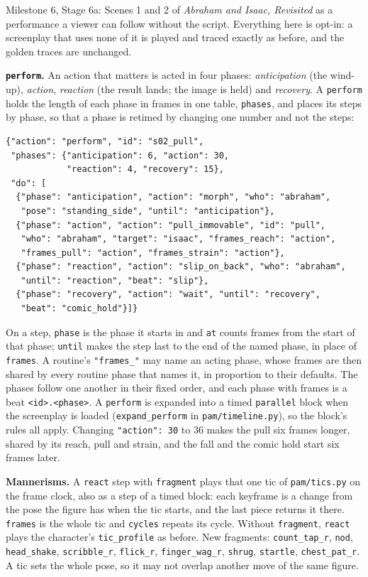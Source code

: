 \documentclass[
  12pt,
  letterpaper,
]{book}
\begin{document}
Milestone 6, Stage 6a: Scenes 1 and 2 of \emph{Abraham and Isaac,
Revisited} as a performance a viewer can follow without the script.
Everything here is opt-in: a screenplay that uses none of it is played
and traced exactly as before, and the golden traces are unchanged.

\textbf{\texttt{perform}.} An action that matters is acted in four
phases: \emph{anticipation} (the wind-up), \emph{action}, \emph{reaction}
(the result lands; the image is held) and \emph{recovery}. A
\texttt{perform} holds the length of each phase in frames in one table,
\texttt{phases}, and places its steps by phase, so that a phase is
retimed by changing one number and not the steps:

\begin{verbatim}
{"action": "perform", "id": "s02_pull",
 "phases": {"anticipation": 6, "action": 30,
            "reaction": 4, "recovery": 15},
 "do": [
  {"phase": "anticipation", "action": "morph", "who": "abraham",
   "pose": "standing_side", "until": "anticipation"},
  {"phase": "action", "action": "pull_immovable", "id": "pull",
   "who": "abraham", "target": "isaac", "frames_reach": "action",
   "frames_pull": "action", "frames_strain": "action"},
  {"phase": "reaction", "action": "slip_on_back", "who": "abraham",
   "until": "reaction", "beat": "slip"},
  {"phase": "recovery", "action": "wait", "until": "recovery",
   "beat": "comic_hold"}]}
\end{verbatim}

On a step, \texttt{phase} is the phase it starts in and \texttt{at}
counts frames from the start of that phase; \texttt{until} makes the
step last to the end of the named phase, in place of \texttt{frames}. A
routine's \texttt{"frames\_<its phase>"} may name an acting phase, whose
frames are then shared by every routine phase that names it, in
proportion to their defaults. The phases follow one another in their
fixed order, and each phase with frames is a beat
\texttt{<id>.<phase>}. A \texttt{perform} is expanded into a timed
\texttt{parallel} block when the screenplay is loaded
(\texttt{expand\_perform} in \texttt{pam/timeline.py}), so the block's
rules all apply. Changing \texttt{"action": 30} to 36 makes the pull six
frames longer, shared by its reach, pull and strain, and the fall and
the comic hold start six frames later.

\textbf{Mannerisms.} A \texttt{react} step with \texttt{fragment} plays
that one tic of \texttt{pam/tics.py} on the frame clock, also as a step
of a timed block: each keyframe is a change from the pose the figure has
when the tic starts, and the last piece returns it there.
\texttt{frames} is the whole tic and \texttt{cycles} repeats its cycle.
Without \texttt{fragment}, \texttt{react} plays the character's
\texttt{tic\_profile} as before. New fragments: \texttt{count\_tap\_r},
\texttt{nod}, \texttt{head\_shake}, \texttt{scribble\_r},
\texttt{flick\_r}, \texttt{finger\_wag\_r}, \texttt{shrug},
\texttt{startle}, \texttt{chest\_pat\_r}. A tic sets the whole pose, so
it may not overlap another move of the same figure.
\end{document}
